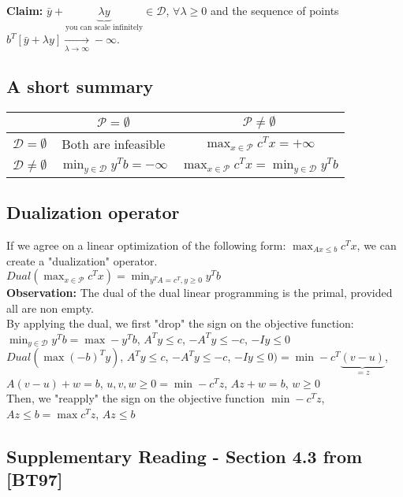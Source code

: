 \documentclass[main]{subfiles}
\begin{document}
\textbf{Claim:} $\bar{y} + \underbrace{\lambda y}_{\text{you can scale
infinitely}} \in \mathcal{D}$, $\forall \lambda \geq 0$ and the sequence of
points $b^T [\bar{y} + \lambda y] \xrightarrow[\lambda \to \infty]{} -\infty$.


\subsection{A short summary}

\begin{center}
 \begin{tabular}{||c c c||} 
 \hline
 & $\mathcal{P} = \emptyset$ & $\mathcal{P} \neq \emptyset$ \\ [0.5ex] 
 \hline\hline
 $\mathcal{D} = \emptyset$ & Both are infeasible &  $\displaystyle \max_{x \in 
 \mathcal{P}} c^{T} x = +\infty$ \\ 
 \hline
 $\mathcal{D} \neq \emptyset$ & $\displaystyle \min_{y \in \mathcal{D}} y^{T}
 b = -\infty$ & $\displaystyle \max_{x \in \mathcal{P}} c^{T} x =
 \displaystyle \min_{y \in \mathcal{D}} y^{T} b$ \\
 \hline
\end{tabular}
\end{center}

\subsection{Dualization operator}
If we agree on a linear optimization of the following form: $\displaystyle 
\max_{Ax \leq b} c^{T} x$, we can create a "dualization" operator.\\

$ Dual(\displaystyle \max_{x \in \mathcal{P}} c^{T} x) = \displaystyle
\min_{y^T A = c^T, y \geq 0} y^{T} b$\\

\textbf{Observation:} The dual of the dual linear programming is the primal, 
provided all are non empty.\\

By applying the dual, we first "drop" the sign on the objective function:\\
 $\displaystyle \min_{y \in \mathcal{D}} y^{T} b =
 \displaystyle \max -y^{T}b$,  $A^T y \leq c$, $-A^T y \leq -c$, $-Iy \leq 0$
 \\
 
$ Dual(\displaystyle \max (-b)^{T} y)$, $A^T y \leq c$, $-A^T y \leq -c$, $-Iy
\leq 0) =  \displaystyle \min -c^{T}\underbrace{(v - u)}_{=z}$, $A(v-u)+w = b$, 
$u, v, w \geq 0 = \displaystyle \min -c^T z$, $Az + w =b$, $w \geq 0$\\

Then, we "reapply" the sign on the objective function 
$\displaystyle \min -c^{T} z$, $Az \leq b = \displaystyle \max c^{T} z$, $Az
\leq b$

\subsection{Supplementary Reading - Section 4.3 from [BT97]}
\end{document}
